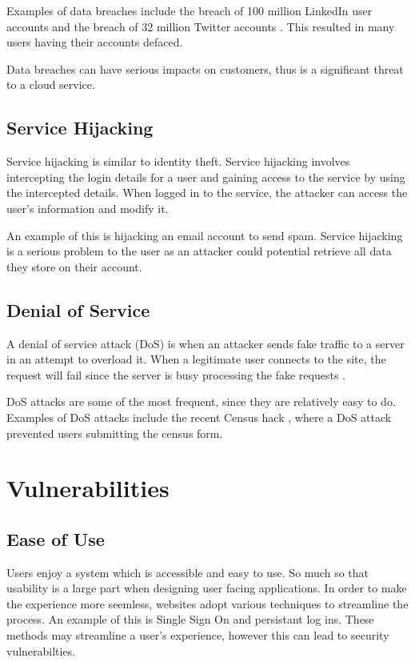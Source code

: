 Examples of data breaches include the breach of 100 million LinkedIn user accounts \cite{linkedin_update_2012} and the breach of 32 million Twitter accounts \cite{leakedsource_leakedsource_2016}. This resulted in many users having their accounts defaced.

Data breaches can have serious impacts on customers, thus is a significant threat to a cloud service.

\subsection{Service Hijacking}

Service hijacking is similar to identity theft. Service hijacking involves intercepting the login details for a user and gaining access to the service by using the intercepted details. When logged in to the service, the attacker can access the user's information and modify it.

An example of this is hijacking an email account to send spam. Service hijacking is a serious problem to the user as an attacker could potential retrieve all data they store on their account.

\subsection{Denial of Service}

A denial of service attack (DoS) is when an attacker sends fake traffic to a server in an attempt to overload it. When a legitimate user connects to the site, the request will fail since the server is busy processing the fake requests \cite{department_of_homeland_security_understanding_2009}.

DoS attacks are some of the most frequent, since they are relatively easy to do. Examples of DoS attacks include the recent Census hack \cite{abc_abs_2016}, where a DoS attack prevented users submitting the census form.


\section{Vulnerabilities}

\subsection{Ease of Use}

Users enjoy a system which is accessible and easy to use. So much so that usability is a large part when designing user facing applications. 
In order to make the experience more seemless, websites adopt various techniques to streamline the process. An example of this is Single Sign On and persistant log ins. These methods may streamline a user's experience, however this can lead to security vulnerabilties\cite{javaid_secure_2013}.

